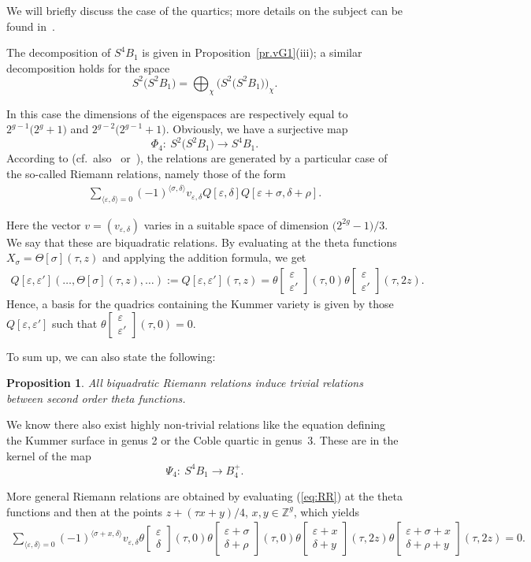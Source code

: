 \documentclass[pdftex]{sigma}
\numberwithin{equation}{section}
\newtheorem{Proposition}[Theorem]{Proposition}
{ \theoremstyle{definition}
\newtheorem{Remark}[Theorem]{Remark} }
\newcommand{\de}{\delta}
\newcommand{\ep}{\varepsilon}
\newcommand{\ZZ}{{\mathbb{Z}}}
\def\ZZ{{\mathbb Z}}
\def\t{\theta}
\def\s{\sigma}
\def\r{\rho}
\def\T{\Theta}
\def\tt#1#2{{\t\left[\begin{matrix}{#1}\\ {#2}\end{matrix}\right]}}
\begin{document}
We will briefly discuss the case of the quartics; more details on the subject can be found in~\cite{vG}.

The decomposition of $S^4B_1$ is given in Proposition~\ref{pr.vG1}(iii); a similar decomposition holds for the space
\[
S^2\big(S^2B_1\big)=\bigoplus_{\chi} \big(S^2\big(S^2B_1\big)\big)_{\chi}.
\]

In this case the dimensions of the eigenspaces are respectively equal to $2^{g-1} \big(2^g+1\big)$ and $2^{g-2}\big(2^{g-1}+1\big)$. Obviously, we have a surjective map
\[
 \Phi_4\colon \ S^2\big(S^2B_1\big)\to S^4B_1.
\]
 According to \cite{fay} (cf.\ also~\cite{APS} or~\cite{FGS}), the relations are generated by a particular case of the so-called Riemann relations, namely those of the form
\begin{gather}\label{eq:RR}
\sum_{\langle\ep,\de\rangle =0} (-1)^{\langle \s, \de\rangle} v_{\ep,\de}Q[\ep, \de]Q[\ep+\s, \de+\r] .
\end{gather}

Here the vector $v=( v_{\ep,\de})$ varies in a suitable space of dimension $\big(2^{2g}-1\big)/3$. We say that these are biquadratic relations. By evaluating at the theta functions
$X_{\s}=\T[\s](\tau,z)$ and applying the addition formula, we get
\begin{gather}\label{eq:vT}
Q[\ep, \ep'](\dots,\T[\s](\tau,z),\dots):=Q[\ep, \ep'](\tau, z) =\tt \ep {\ep'} (\tau, 0)\tt \ep {\ep'} (\tau, 2z).
 \end{gather}
Hence, a basis for the quadrics containing the Kummer variety is given by those $Q[\ep, \ep']$ such that
$\theta\left[\begin{smallmatrix}\ep \\ \ep' \end{smallmatrix}\right] (\tau, 0)=0$.

To sum up, we can also state the following:

\begin{Proposition} \label{trivial relations}
All biquadratic Riemann relations induce trivial relations between second order theta functions.
\end{Proposition}

 We know there also exist highly non-trivial relations like the equation defining the Kummer surface in genus 2 or the Coble quartic in genus~3. These are in the kernel of the map
\[
\Psi_4\colon \ S^4B_1\to B_4^+.
\]
\begin{Remark} More general Riemann relations are obtained by evaluating (\ref{eq:RR}) at the theta functions and then at the points $z+(\tau x+y)/4$, $x,y \in\ZZ^g$, which yields
\begin{gather}\label{eq:RR2}
\sum_{\langle\ep,\de\rangle =0}\! (-1)^{\langle\s+x, \de\rangle } v_{\ep,\de} \tt\ep\de(\tau,0)\tt{\ep+\s }{\de+\r}(\tau,0)\tt{\ep+x}{\de+y}(\tau,2z)\tt{\ep+\s+x}{\de+\r+y}(\tau,2z)=0.\!\!\!
\end{gather}
\end{Remark}
\end{document}
